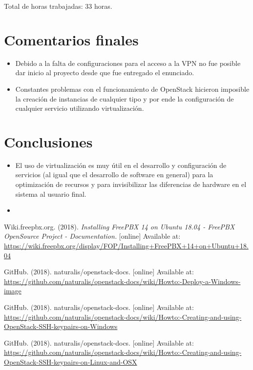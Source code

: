 \documentclass{article}
\begin{document}
Total de horas trabajadas: 33 horas.

\section{Comentarios finales}
\begin{itemize}
  \item Debido a la falta de configuraciones para el acceso a la VPN no fue posible dar inicio al proyecto desde que fue entregado el enunciado.
  \item Constantes problemas con el funcionamiento de OpenStack hicieron imposible la creaci\'on de instancias de cualquier tipo y por ende la configuraci\'on de cualquier servicio utilizando virtualizaci\'on.
\end{itemize}

\section{Conclusiones}
\begin{itemize}
  \item El uso de virtualizaci\'on es muy \'util en el desarrollo y configuraci\'on de servicios (al igual que el desarrollo de software en general) para la optimizaci\'on de recursos y para invisibilizar las diferencias de hardware en el sistema al usuario final.
  \item 
\end{itemize}

\begin{thebibliography}{9}
  Wiki.freepbx.org. (2018). \emph{Installing FreePBX 14 on Ubuntu 18.04 - FreePBX OpenSource Project - Documentation.}
  [online] Available at: \url{https://wiki.freepbx.org/display/FOP/Installing+FreePBX+14+on+Ubuntu+18.04}

  GitHub. (2018). naturalis/openstack-docs.
  [online] Available at: \url{https://github.com/naturalis/openstack-docs/wiki/Howto:-Deploy-a-Windows-image}

  GitHub. (2018). naturalis/openstack-docs.
  [online] Available at: \url{https://github.com/naturalis/openstack-docs/wiki/Howto:-Creating-and-using-OpenStack-SSH-keypairs-on-Windows}

  GitHub. (2018). naturalis/openstack-docs.
  [online] Available at: \url{https://github.com/naturalis/openstack-docs/wiki/Howto:-Creating-and-using-OpenStack-SSH-keypairs-on-Linux-and-OSX}

\end{thebibliography}
\end{document}
